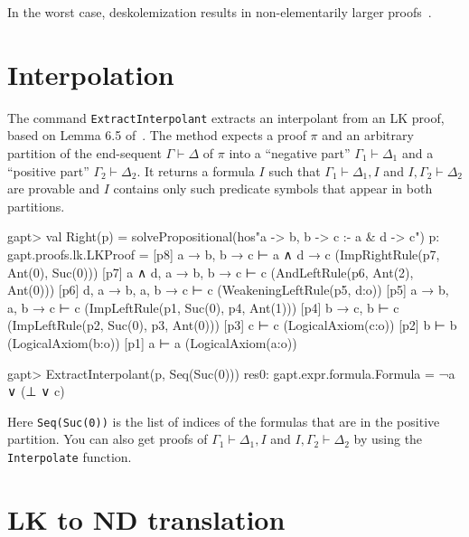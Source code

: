 \documentclass[a4paper,11pt]{book}
\newcommand{\seq}{\vdash}	%
\begin{document}
In the worst case, deskolemization results in non-elementarily larger
proofs~\cite{Aguilera2016Unsound}.

\section{Interpolation}

The command \texttt{ExtractInterpolant} extracts an interpolant from an LK
proof, based on Lemma 6.5 of~\cite{Takeuti87Proof}.  The method expects a proof
$\pi$ and an arbitrary partition of the end-sequent $\Gamma \seq \Delta$ of
$\pi$ into a ``negative part'' $\Gamma_1\seq\Delta_1$ and a ``positive part''
$\Gamma_2 \seq \Delta_2$.  It returns a formula $I$ such that
$\Gamma_1\seq\Delta_1, I$ and $I,\Gamma_2\seq\Delta_2$ are provable and $I$
contains only such predicate symbols that appear in both partitions.

\begin{clilisting}
gapt> val Right(p) = solvePropositional(hos"a -> b, b -> c :- a & d -> c")
p: gapt.proofs.lk.LKProof =
[p8] a → b, b → c ⊢ a ∧ d → c    (ImpRightRule(p7, Ant(0), Suc(0)))
[p7] a ∧ d, a → b, b → c ⊢ c    (AndLeftRule(p6, Ant(2), Ant(0)))
[p6] d, a → b, a, b → c ⊢ c    (WeakeningLeftRule(p5, d:o))
[p5] a → b, a, b → c ⊢ c    (ImpLeftRule(p1, Suc(0), p4, Ant(1)))
[p4] b → c, b ⊢ c    (ImpLeftRule(p2, Suc(0), p3, Ant(0)))
[p3] c ⊢ c    (LogicalAxiom(c:o))
[p2] b ⊢ b    (LogicalAxiom(b:o))
[p1] a ⊢ a    (LogicalAxiom(a:o))

gapt> ExtractInterpolant(p, Seq(Suc(0)))
res0: gapt.expr.formula.Formula = ¬a ∨ (⊥ ∨ c)

\end{clilisting}

Here \texttt{Seq(Suc(0))} is the list of indices of the formulas that are in
the positive partition.  You can also get proofs of $\Gamma_1 \vdash \Delta_1,
I$ and $I, \Gamma_2 \vdash \Delta_2$ by using the \texttt{Interpolate}
function.

\section{LK to ND translation}
\end{document}
